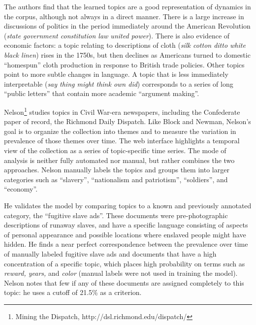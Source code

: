 The authors find that the learned topics are a good representation of dynamics in the corpus, although not always in a direct manner.
There is a large increase in discussions of politics in the period immediately around the American Revolution ({\em state government constitution law united power}).
There is also evidence of economic factors: a topic relating to descriptions of cloth ({\em silk cotton ditto white black linen}) rises in the 1750s, but then declines as Americans turned to domestic ``homespun'' cloth production in response to British trade policies.
Other topics point to more subtle changes in language.
A topic that is less immediately interpretable ({\em  say thing might think own did}) corresponds to a series of long ``public letters'' that contain more academic ``argument making''.



Nelson\footnote{Mining the Dispatch, http://dsl.richmond.edu/dispatch/} studies topics in Civil War-era newspapers, including the Confederate paper of record, the Richmond Daily Dispatch.
Like Block and Newman, Nelson's goal is to organize the collection into themes and to measure the variation in prevalence of those themes over time.
The web interface highlights a temporal view of the collection as a series of topic-specific time series.
The mode of analysis is neither fully automated nor manual, but rather combines the two approaches. 
Nelson manually labels the topics and groups them into larger categories such as ``slavery'', ``nationalism and patriotism'', ``soldiers'', and ``economy''.

He validates the model by comparing topics to a known and previously annotated category, the ``fugitive slave ads''. 
These documents were pre-photographic descriptions of runaway slaves, and have a specific language consisting of aspects of personal appearance and possible locations where enslaved people might have  hidden.
He finds a near perfect correspondence between the prevalence over time of manually labeled fugitive slave ads and documents that have a high concentration of a specific topic, which places high probability on terms such as {\em reward, years,} and {\em color} (manual labels were not used  in training the model).
Nelson notes that few if any of these documents are assigned completely to this topic: he uses a cutoff of 21.5\% as a criterion.

